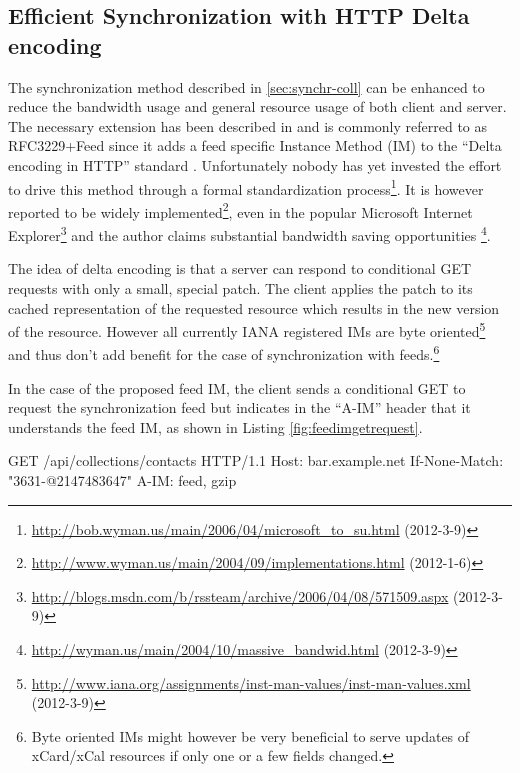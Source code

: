 \documentclass[11pt,a4paper,headsepline,twoside]{scrartcl}		%
\newcommand{\citeurl}[2]{\url{#1} (#2)}
\begin{document}
\subsection{Efficient Synchronization with HTTP Delta encoding}
\label{sec:effic-synchr-with}

The synchronization method described in \autoref{sec:synchr-coll} can be
enhanced to reduce the bandwidth usage and general resource usage of both client
and server. The necessary extension has been described in \cite{Wyman2004} and
is commonly referred to as RFC3229+Feed since it adds a feed specific Instance
Method (IM) to the ``Delta encoding in HTTP''
standard \cite{RFC3229}. Unfortunately nobody has yet invested the effort to
drive this method through a formal standardization
process\footnote{\citeurl{http://bob.wyman.us/main/2006/04/microsoft_to_su.html}{2012-3-9}}. It
is however reported to be widely
implemented\footnote{\citeurl{http://www.wyman.us/main/2004/09/implementations.html}{2012-1-6}},
even in the popular Microsoft Internet
Explorer\footnote{\citeurl{http://blogs.msdn.com/b/rssteam/archive/2006/04/08/571509.aspx}{2012-3-9}}
and the author claims substantial bandwidth saving opportunities
\footnote{\citeurl{http://wyman.us/main/2004/10/massive_bandwid.html}{2012-3-9}}.

The idea of delta encoding is that a server can respond to conditional GET
requests with only a small, special patch. The client applies the patch to its
cached representation of the requested resource which results in the new version
of the resource. However all currently IANA registered IMs are byte
oriented\footnote{\citeurl{http://www.iana.org/assignments/inst-man-values/inst-man-values.xml}{2012-3-9}}
and thus don't add benefit for the case of synchronization with
feeds.\footnote{Byte oriented IMs might however be very beneficial to serve
  updates of xCard/xCal resources if only one or a few fields changed.}

In the case of the proposed feed IM, the client sends a conditional GET to
request the synchronization feed but indicates in the ``A-IM'' header that it
understands the feed IM, as shown in Listing \ref{fig:feedimgetrequest}.

\begin{anylisting}[label=fig:feedimgetrequest,
                   float=h,
                   caption={HTTP GET request using feed delta encoding}]
GET /api/collections/contacts HTTP/1.1
Host: bar.example.net
If-None-Match: "3631-@2147483647"
A-IM: feed, gzip
\end{anylisting}
\end{document}

